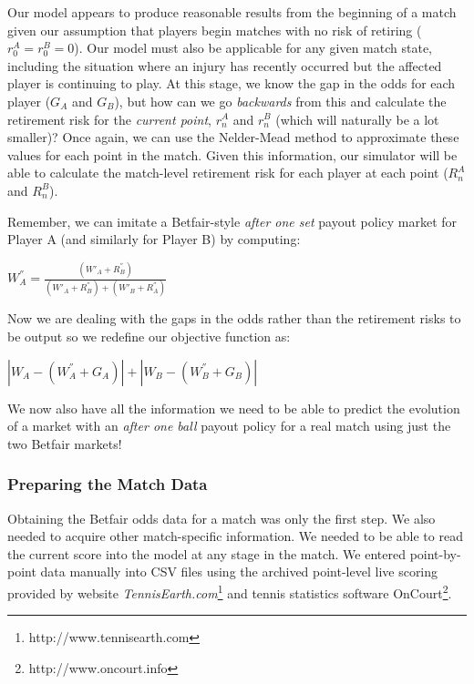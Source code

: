 \documentclass[authoryear, 12pt]{elsarticle}
\begin{document}
Our model appears to produce reasonable results from the beginning of a match given our assumption that players begin matches with no risk of retiring ($r_0^A = r_0^B = 0$).  Our model must also be applicable for any given match state, including the situation where an injury has recently occurred but the affected player is continuing to play.  At this stage, we know the gap in the odds for each player ($G_A$ and $G_B$), but how can we go \textit{backwards} from this and calculate the retirement risk for the \textit{current point}, $r_n^A$ and $r_n^B$ (which will naturally be a lot smaller)?  Once again, we can use the Nelder-Mead method to approximate these values for each point in the match.  Given this information, our simulator will be able to calculate the match-level retirement risk for each player at each point ($R_n^A$ and $R_n^B$).

Remember, we can imitate a Betfair-style \textit{after one set} payout policy market for Player A (and similarly for Player B) by computing:

\begin{center}
	$W_A^{''} = \frac{(W'_A + R_B^{''})}{(W'_A + R_B^{''}) + (W'_B + R_A^{''})}$
\end{center}

Now we are dealing with the gaps in the odds rather than the retirement risks to be output so we redefine our objective function as:

\begin{center}
	$\left|W_A - (W_A^{''} + G_A)\right| + \left|W_B - (W_B^{''} + G_B)\right|$
\end{center}

We now also have all the information we need to be able to predict the evolution of a market with an \textit{after one ball} payout policy for a real match using just the two Betfair markets!

\subsubsection{Preparing the Match Data}

Obtaining the Betfair odds data for a match was only the first step.  We also needed to acquire other match-specific information.  We needed to be able to read the current score into the model at any stage in the match.  We entered point-by-point data manually into CSV files using the archived point-level live scoring provided by website \textit{TennisEarth.com}\footnote{http://www.tennisearth.com} and tennis statistics software OnCourt\footnote{http://www.oncourt.info}.  
\end{document}
